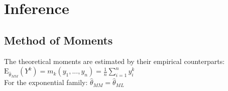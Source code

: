 \documentclass[8pt]{extarticle}
\begin{document}




\section{Inference}


\subsection{Method of Moments}

The theoretical moments are estimated by their empirical counterparts: \ \\
\vspace{0.5em}
$\mathrm{E}_{\hat{\theta}_{MM}}(Y^k) = m_k(y_1,...,y_n) = \frac{1}{n} \sum_{i=1}^{n} y_i^k$ \ \\
\vspace{0.5em}
\noindent For the exponential family: $\hat{\theta}_{MM} = \hat{\theta}_{ML}$
\end{document}
